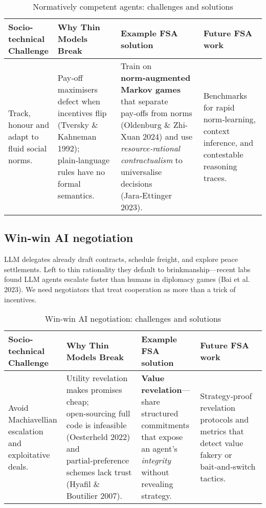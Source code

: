 \begin{table*}[!htbp]
    \centering
    \small
    \begin{tabular}{p{}p{}p{}p{}}
        \toprule
        \textbf{Socio-technical Challenge} & \textbf{Why Thin Models Break} & \textbf{Example FSA solution} & \textbf{Future FSA work} \\
        \midrule
        Track, honour and adapt to fluid social norms. &
        Pay‑off maximisers defect when incentives flip (Tversky \& Kahneman 1992); plain‑language rules have no formal semantics. &
        Train on \textbf{norm‑augmented Markov games} that separate pay‑offs from norms (Oldenburg \& Zhi-Xuan 2024) and use \textit{resource‑rational contractualism} to universalise decisions (Jara‑Ettinger 2023). &
        Benchmarks for rapid norm‑learning, context inference, and contestable reasoning traces. \\
        \bottomrule
    \end{tabular}
    \caption{Normatively competent agents: challenges and solutions}
    \label{tab:normative-competence}
\end{table*}

\subsection{Win‑win AI negotiation}
LLM delegates already draft contracts, schedule freight, and explore peace settlements. Left to thin rationality they default to brinkmanship—recent labs found LLM agents escalate faster than humans in diplomacy games (Bai et al. 2023). We need negotiators that treat cooperation as more than a trick of incentives.

\begin{table*}[!htbp]
    \centering
    \small
    \begin{tabular}{p{}p{}p{}p{}}
        \toprule
        \textbf{Socio-technical Challenge} & \textbf{Why Thin Models Break} & \textbf{Example FSA solution} & \textbf{Future FSA work} \\
        \midrule
        Avoid Machiavellian escalation and exploitative deals. &
        Utility revelation makes promises cheap; open‑sourcing full code is infeasible (Oesterheld 2022) and partial‑preference schemes lack trust (Hyafil \& Boutilier 2007). &
        \textbf{Value revelation}—share structured commitments that expose an agent's \textit{integrity} without revealing strategy. &
        Strategy‑proof revelation protocols and metrics that detect value fakery or bait‑and‑switch tactics. \\
        \bottomrule
    \end{tabular}
    \caption{Win-win AI negotiation: challenges and solutions}
    \label{tab:negotiation}
\end{table*}

